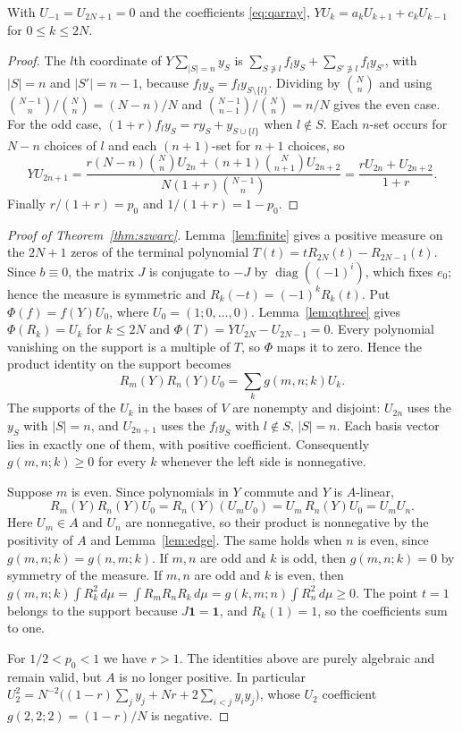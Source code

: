 \begin{lemma}\label{lem:qthree}
With $U_{-1}=U_{2N+1}=0$ and the coefficients \eqref{eq:qarray}, $YU_k=a_kU_{k+1}+c_kU_{k-1}$ for $0\leq k\leq2N$.
\end{lemma}
\begin{proof}
The $l$th coordinate of $Y\sum_{|S|=n}y_S$ is $\sum_{S\not\ni l}f_ly_S+\sum_{S'\not\ni l}f_ly_{S'}$, with $|S|=n$ and $|S'|=n-1$, because $f_ly_S=f_ly_{S\setminus\{l\}}$. Dividing by $\binom Nn$ and using $\binom{N-1}n/\binom Nn=(N-n)/N$ and $\binom{N-1}{n-1}/\binom Nn=n/N$ gives the even case. For the odd case, $(1+r)f_ly_S=ry_S+y_{S\cup\{l\}}$ when $l\notin S$. Each $n$-set occurs for $N-n$ choices of $l$ and each $(n+1)$-set for $n+1$ choices, so
\[
YU_{2n+1}=\frac{r(N-n)\binom Nn U_{2n}+(n+1)\binom N{n+1}U_{2n+2}}{N(1+r)\binom{N-1}n}
=\frac{rU_{2n}+U_{2n+2}}{1+r}.
\]
Finally $r/(1+r)=p_0$ and $1/(1+r)=1-p_0$.
\end{proof}

\begin{proof}[Proof of Theorem~\ref{thm:szwarc}]
Lemma~\ref{lem:finite} gives a positive measure on the $2N+1$ zeros of the terminal polynomial $T(t)=tR_{2N}(t)-R_{2N-1}(t)$. Since $b\equiv0$, the matrix $J$ is conjugate to $-J$ by $\operatorname{diag}((-1)^i)$, which fixes $e_0$; hence the measure is symmetric and $R_k(-t)=(-1)^kR_k(t)$. Put $\Phi(f)=f(Y)U_0$, where $U_0=(1;0,\ldots,0)$. Lemma~\ref{lem:qthree} gives $\Phi(R_k)=U_k$ for $k\leq2N$ and $\Phi(T)=YU_{2N}-U_{2N-1}=0$. Every polynomial vanishing on the support is a multiple of $T$, so $\Phi$ maps it to zero. Hence the product identity on the support becomes
\[
R_m(Y)R_n(Y)U_0=\sum_kg(m,n;k)U_k.
\]
The supports of the $U_k$ in the bases of $V$ are nonempty and disjoint: $U_{2n}$ uses the $y_S$ with $|S|=n$, and $U_{2n+1}$ uses the $f_ly_S$ with $l\notin S$, $|S|=n$. Each basis vector lies in exactly one of them, with positive coefficient. Consequently $g(m,n;k)\geq0$ for every $k$ whenever the left side is nonnegative.

Suppose $m$ is even. Since polynomials in $Y$ commute and $Y$ is $A$-linear,
\[
R_m(Y)R_n(Y)U_0=R_n(Y)(U_mU_0)=U_m\,R_n(Y)U_0=U_mU_n.
\]
Here $U_m\in A$ and $U_n$ are nonnegative, so their product is nonnegative by the positivity of $A$ and Lemma~\ref{lem:edge}. The same holds when $n$ is even, since $g(m,n;k)=g(n,m;k)$. If $m,n$ are odd and $k$ is odd, then $g(m,n;k)=0$ by symmetry of the measure. If $m,n$ are odd and $k$ is even, then $g(m,n;k)\int R_k^2\,d\mu=\int R_mR_nR_k\,d\mu=g(k,m;n)\int R_n^2\,d\mu\geq0$. The point $t=1$ belongs to the support because $J\boldsymbol1=\boldsymbol1$, and $R_k(1)=1$, so the coefficients sum to one.

For $1/2<p_0<1$ we have $r>1$. The identities above are purely algebraic and remain valid, but $A$ is no longer positive. In particular $U_2^2=N^{-2}\big((1-r)\sum_jy_j+Nr+2\sum_{i<j}y_iy_j\big)$, whose $U_2$ coefficient $g(2,2;2)=(1-r)/N$ is negative.
\end{proof}

